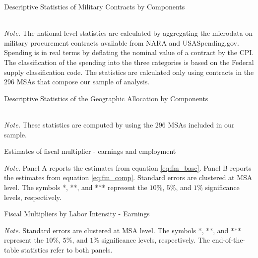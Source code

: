 \documentclass[dv_diss_main.tex]{subfiles}
\begin{document}
\begin{table}[H]
\begin{center}
    \caption{Descriptive Statistics of Military Contracts by Components}\label{tab:desstats_contracts}
	\resizebox{!}{!}{
    
    }
\end{center}
   \\
\footnotesize{\textit{Note.} The national level statistics are calculated by aggregating the microdata on military procurement contracts available from NARA and USASpending.gov. Spending is in real terms by deflating the nominal value of a contract by the CPI. The classification of the spending into the three categories is based on the Federal supply classification code. The statistics are calculated only using contracts in the $296$ MSAs that compose our sample of analysis.}

\end{table} 
\newpage

\begin{table}[H]
\begin{center}
    \caption{Descriptive Statistics of the Geographic Allocation by Components}
    \label{tab:desstats_cbsas}
	\resizebox{!}{!}{
    
    }
\end{center}
    \\
\footnotesize{\textit{Note. } These statistics are computed by using the $296$ MSAs included in our sample.}
\end{table} 
\newpage


\begin{table}[H]
    \begin{center}
      \caption{Estimates of fiscal multiplier - earnings and employment}
    \label{tab:fm_main}
	\resizebox*{!}{0.9\textheight}	{
    
    }  
    \end{center}
    \footnotesize{\textit{Note. } Panel A reports the estimates from equation \eqref{eq:fm_base}. Panel B reports the estimates from equation \eqref{eq:fm_comp}. Standard errors are clustered at MSA level. The symbols *, **, and *** represent the $10\%$, $5\%$, and $1\%$ significance levels, respectively.}
\end{table}

\newpage

\begin{table}[H]
    \begin{center}
    \caption{Fiscal Multipliers by Labor Intensity - Earnings}
    \label{tab:fm_labint}
	\resizebox{\textwidth}{!}{
    
    }
    \end{center}
        
    \footnotesize{\textit{Note. } Standard errors are clustered at MSA level. The symbols *, **, and *** represent the $10\%$, $5\%$, and $1\%$ significance levels, respectively. The end-of-the-table statistics refer to both panels.}
    
\end{table}
\newpage
\end{document}
